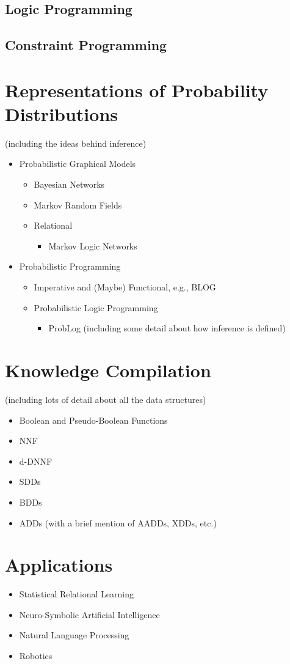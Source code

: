 \subsection{Logic Programming} \label{sec:lp}

\subsection{Constraint Programming} \label{sec:cp}

\section{Representations of Probability Distributions}

(including the ideas behind inference)
\begin{itemize}
\item Probabilistic Graphical Models
  \begin{itemize}
  \item Bayesian Networks
  \item Markov Random Fields
  \item Relational
    \begin{itemize}
    \item Markov Logic Networks
    \end{itemize}
  \end{itemize}
\item Probabilistic Programming
  \begin{itemize}
  \item Imperative and (Maybe) Functional, e.g., BLOG
  \item Probabilistic Logic Programming
    \begin{itemize}
    \item ProbLog (including some detail about how inference is defined)
    \end{itemize}
  \end{itemize}
\end{itemize}

\section{Knowledge Compilation} \label{sec:kc}

(including lots of detail about all the data structures)
\begin{itemize}
\item Boolean and Pseudo-Boolean Functions
\item NNF
\item d-DNNF
\item SDDs
\item BDDs
\item ADDs (with a brief mention of AADDs, XDDs, etc.)
\end{itemize}

\section{Applications}

\begin{itemize}
\item Statistical Relational Learning
\item Neuro-Symbolic Artificial Intelligence
\item Natural Language Processing
\item Robotics
\end{itemize}
